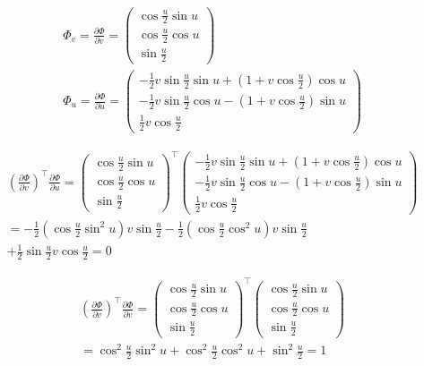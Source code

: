 {\begin{equation}
\begin{split}
\Phi _{v}=\frac{\partial \Phi }{\partial v}=\allowbreak
\begin{pmatrix}
\cos \frac{u}{2}\sin u \\
\cos \frac{u}{2}\cos u \\
\sin \frac{u}{2}
\end{pmatrix}
 \\
\Phi _{u}=\frac{\partial \Phi }{\partial u}=\allowbreak
\begin{pmatrix}
-\frac{1}{2}v\sin \frac{u}{2}\sin u+\left( 1+v\cos \frac{u}{2}\right) \cos u \\
-\frac{1}{2}v\sin \frac{u}{2}\cos u-\left( 1+v\cos \frac{u}{2}\right) \sin u \\
\frac{1}{2}v\cos \frac{u}{2}
\end{pmatrix}
\end{split}
\end{equation}


\begin{equation}
\begin{split}
\left(\frac{\partial \Phi }{\partial v}\right)^\intercal\frac{\partial \Phi }{\partial u}
=  \allowbreak
\begin{pmatrix}
\cos \frac{u}{2}\sin u \\
\cos \frac{u}{2}\cos u \\
\sin \frac{u}{2}
\end{pmatrix}^\intercal
\begin{pmatrix}
-\frac{1}{2}v\sin \frac{u}{2}\sin u+\left( 1+v\cos \frac{u}{2}\right) \cos u \\
-\frac{1}{2}v\sin \frac{u}{2}\cos u-\left( 1+v\cos \frac{u}{2}\right) \sin u \\
\frac{1}{2}v\cos \frac{u}{2}
\end{pmatrix}
\\
=
-\frac{1}{2}\left( \cos \frac{u}{2}\sin ^{2}u\right) v\sin \frac{u}{2}-%
\frac{1}{2}\left( \cos \frac{u}{2}\cos ^{2}u\right) v\sin \frac{u}{2}
\\
+%
\frac{1}{2}\sin \frac{u}{2} v\cos \frac{u}{2}=\allowbreak 0
\end{split}
\end{equation}

\begin{equation}
\begin{split}
\left(\frac{\partial \Phi }{\partial v}\right)^\intercal \frac{\partial \Phi }{\partial v}
=\allowbreak
\begin{pmatrix}
\cos \frac{u}{2}\sin u \\
\cos \frac{u}{2}\cos u \\
\sin \frac{u}{2}
\end{pmatrix}^\intercal
\begin{pmatrix}
\cos \frac{u}{2}\sin u \\
\cos \frac{u}{2}\cos u \\
\sin \frac{u}{2}
\end{pmatrix}
 \\
=
\cos ^{2}\frac{u}{2}\sin ^{2}u+\cos ^{2}\frac{u}{2}\cos ^{2}u+\sin ^{2}%
\frac{u}{2}=\allowbreak 1
\end{split}
\end{equation}


}

